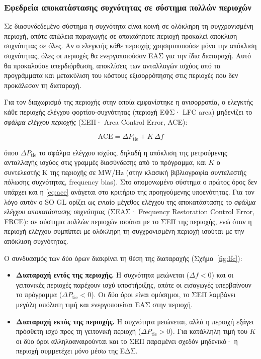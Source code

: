 \subsubsection*{Εφεδρεία αποκατάστασης συχνότητας σε σύστημα πολλών περιοχών}

Σε διασυνδεδεμένο σύστημα η συχνότητα είναι κοινή σε ολόκληρη τη συγχρονισμένη περιοχή,
οπότε απώλεια παραγωγής σε οποιαδήποτε περιοχή προκαλεί απόκλιση συχνότητας σε όλες. Αν ο
ελεγκτής κάθε περιοχής χρησιμοποιούσε μόνο την απόκλιση συχνότητας, όλες οι περιοχές θα
ενεργοποιούσαν ΕΑΣ για την ίδια διαταραχή. Αυτό θα προκαλούσε υπερδιόρθωση, αποκλίσεις των
ανταλλαγών ισχύος από τα προγράμματα και μετακύλιση του κόστους εξισορρόπησης στις περιοχές
που δεν προκάλεσαν τη διαταραχή.

Για τον διαχωρισμό της περιοχής στην οποία εμφανίστηκε η ανισορροπία, ο ελεγκτής κάθε
περιοχής ελέγχου φορτίου-συχνότητας (περιοχή ΕΦΣ· LFC area) μηδενίζει το \emph{σφάλμα ελέγχου
περιοχής} (ΣΕΠ· Area Control Error, ACE):

\begin{equation}
\mathrm{ACE} = \Delta P_{\mathrm{tie}} + K \, \Delta f
\label{eq:ace}
\end{equation}

όπου $\Delta P_{\mathrm{tie}}$ το σφάλμα ελέγχου ισχύος, δηλαδή η απόκλιση της μετρούμενης
ανταλλαγής ισχύος στις γραμμές διασύνδεσης από το πρόγραμμα, και $K$ ο συντελεστής K της
περιοχής σε MW/Hz (στην κλασική βιβλιογραφία συντελεστής πόλωσης συχνότητας, frequency
bias). Στο απομονωμένο σύστημα ο πρώτος όρος δεν υπάρχει και η \eqref{eq:ace} ανάγεται στο
κριτήριο της προηγούμενης υποενότητας. Για τον λόγο αυτόν ο SO GL ορίζει ως ενιαίο μέγεθος
ελέγχου της αποκατάστασης το \emph{σφάλμα ελέγχου αποκατάστασης συχνότητας} (ΣΕΑΣ·
Frequency Restoration Control Error, FRCE): σε σύστημα πολλών περιοχών ισούται με το ΣΕΠ
της περιοχής, ενώ όταν η περιοχή ελέγχου συμπίπτει με ολόκληρη τη συγχρονισμένη περιοχή
ισούται με την απόκλιση συχνότητας.

Ο συνδυασμός των δύο όρων διακρίνει τη θέση της διαταραχής (Σχήμα~\ref{fig:lfc}):

\begin{itemize}
\item \textbf{Διαταραχή εντός της περιοχής.} Η συχνότητα μειώνεται ($\Delta f < 0$) και οι
      γειτονικές περιοχές παρέχουν ισχύ υποστήριξης, οπότε οι εισαγωγές υπερβαίνουν το
      πρόγραμμα ($\Delta P_{\mathrm{tie}} < 0$). Οι δύο όροι είναι ομόσημοι, το ΣΕΠ λαμβάνει
      μεγάλη απόλυτη τιμή και ενεργοποιείται ΕΑΣ στην περιοχή.
\item \textbf{Διαταραχή εκτός της περιοχής.} Η συχνότητα μειώνεται, αλλά η περιοχή εξάγει
      πρόσθετη ισχύ προς τη γειτονική περιοχή ($\Delta P_{\mathrm{tie}} > 0$). Για κατάλληλη
      τιμή του $K$ οι δύο όροι αλληλοαναιρούνται και το ΣΕΠ παραμένει σχεδόν μηδενικό· η
      περιοχή συμμετέχει μόνο μέσω της ΕΔΣ.
\end{itemize}

